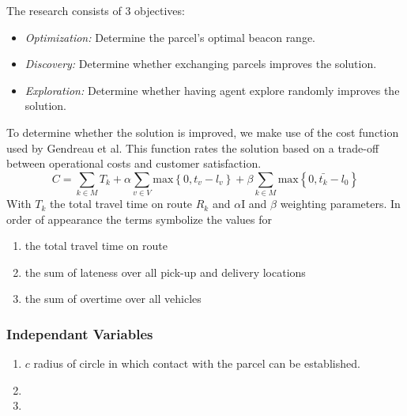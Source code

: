 \documentclass[../main.tex]{subfiles}
\begin{document}
The research consists of 3 objectives:
\begin{itemize}
	\item \textit{Optimization:} Determine the parcel's optimal beacon range.
	\item \textit{Discovery:} Determine whether exchanging parcels improves the solution.
	\item \textit{Exploration:} Determine whether having agent explore randomly improves the solution.
\end{itemize}
To determine whether the solution is improved, we make use of the cost function used by Gendreau et al. This function rates the solution based on a trade-off between operational costs and customer satisfaction. \cite{gendreau2006neighborhood}
$$
C = \sum_{k \in M}{T_k} + \alpha \sum_{v \in V} \text{max} \left\{ 0, t_v - l_v \right\} + \beta \sum_{k \in M} \text{max} \left\{0, \bar{t_k} - l_0 \right\}
$$
With $T_k$ the total travel time on route $R_k$ and $\alpha$I and $\beta$ weighting parameters. In order of appearance the terms symbolize the values for
\begin{enumerate}
	\item the total travel time on route
	\item the sum of lateness over all pick-up and delivery locations
	\item the sum of overtime over all vehicles
\end{enumerate}

\subsubsection{Independant Variables}
\begin{enumerate}
	\item $c$ radius of circle in which contact with the parcel can be established.
	\item
	\item
\end{enumerate}
\end{document}
